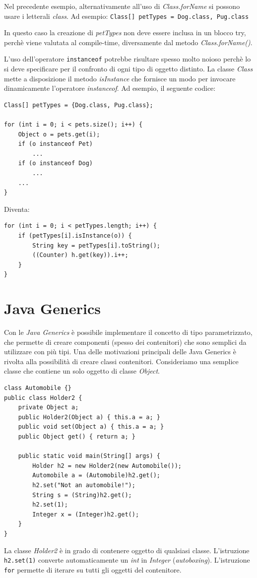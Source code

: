 \documentclass[12pt]{report}
\begin{document}
Nel precedente esempio, alternativamente all'uso di \textit{Class.forName} si possono usare i letterali \textit{class}. Ad esempio: \texttt{Class[] petTypes = {Dog.class, Pug.class}}

In questo caso la creazione di \textit{petTypes} non deve essere inclusa in un blocco try, perchè viene valutata al compile-time, diversamente dal metodo \textit{Class.forName()}.

L'uso dell'operatore \texttt{instanceof} potrebbe risultare spesso molto noioso perchè lo si deve specificare per il confronto di ogni tipo di oggetto distinto. La classe \textit{Class} mette a disposizione il metodo \textit{isInstance} che fornisce un modo per invocare dinamicamente l'operatore \textit{instanceof}. Ad esempio, il seguente codice:
\begin{lstlisting}[style=javastyle]
Class[] petTypes = {Dog.class, Pug.class};

for (int i = 0; i < pets.size(); i++) {
	Object o = pets.get(i);
	if (o instanceof Pet)
		...
	if (o instanceof Dog)
		...
	...
}
\end{lstlisting}
Diventa:
\begin{lstlisting}[style=javastyle]
for (int i = 0; i < petTypes.length; i++) {
	if (petTypes[i].isInstance(o)) {
		String key = petTypes[i].toString();
		((Counter) h.get(key)).i++;
	}
}
\end{lstlisting}
\section{Java Generics}
Con le \textit{Java Generics} è possibile implementare il concetto di tipo parametrizzato, che permette di creare componenti (spesso dei contenitori) che sono semplici da utilizzare con più tipi. Una delle motivazioni principali delle Java Generics è rivolta alla possibilità di creare classi contenitori. Consideriamo una semplice classe che contiene un solo oggetto di classe \textit{Object}.
\begin{lstlisting}[style=javastyle]
class Automobile {}
public class Holder2 {
	private Object a;
	public Holder2(Object a) { this.a = a; }
	public void set(Object a) { this.a = a; }
	public Object get() { return a; }

	public static void main(String[] args) {
		Holder h2 = new Holder2(new Automobile());
		Automobile a = (Automobile)h2.get();
		h2.set("Not an automobile!");
		String s = (String)h2.get();
		h2.set(1);
		Integer x = (Integer)h2.get();
	}
}
\end{lstlisting}
La classe \textit{Holder2} è in grado di contenere oggetto di qualsiasi classe. L'istruzione \texttt{h2.set(1)} converte automaticamente un \textit{int} in \textit{Integer} (\textit{autoboxing}). L'istruzione \texttt{for} permette di iterare su tutti gli oggetti del contenitore.
\end{document}
